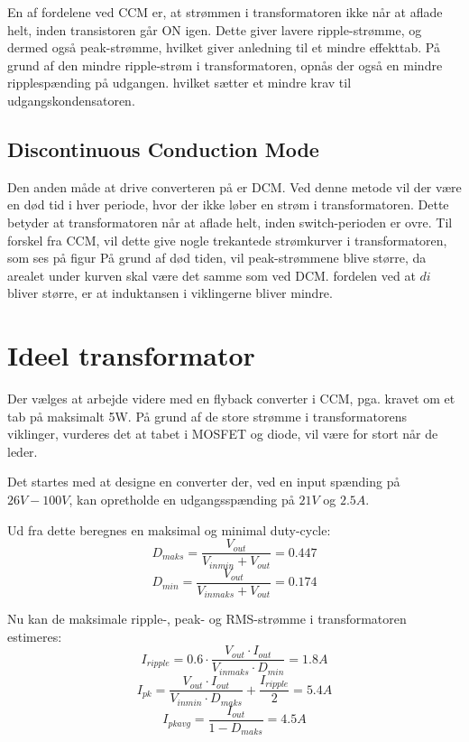 \noindent En af fordelene ved CCM er, at strømmen i transformatoren ikke når at aflade helt, inden transistoren går ON igen. Dette giver lavere ripple-strømme, og dermed også peak-strømme, hvilket giver anledning til et mindre effekttab. På grund af den mindre ripple-strøm i transformatoren, opnås der også en mindre ripplespænding på udgangen. hvilket sætter et mindre krav til udgangskondensatoren. 

\subsection{Discontinuous Conduction Mode}
Den anden måde at drive converteren på er DCM. Ved denne metode vil der være en død tid i hver periode, hvor der ikke løber en strøm i transformatoren. Dette betyder at transformatoren når at aflade helt, inden switch-perioden er ovre. Til forskel fra CCM, vil dette give nogle trekantede strømkurver i transformatoren, som ses på figur %
På grund af død tiden, vil peak-strømmene blive større, da arealet under kurven skal være det samme som ved DCM. fordelen ved at $di$ bliver større, er at induktansen i viklingerne bliver mindre. 

\section{Ideel transformator}
Der vælges at arbejde videre med en flyback converter i CCM, pga. kravet om et tab på maksimalt 5W. På grund af de store strømme i transformatorens viklinger, vurderes det at tabet i MOSFET og diode, vil være for stort når de leder. 

Det startes med at designe en converter der, ved en input spænding på $26V-100V$, kan opretholde en udgangsspænding på $21V$ og $2.5A$. 

\noindent Ud fra dette beregnes en maksimal og minimal duty-cycle:
\begin{equation} \label{D_maks_CCM}
D_{maks} = \frac{V_{out}}{V_{inmin} + V_{out}} = 0.447
\end{equation}
\begin{equation} \label{D_min_CCM}
D_{min} = \frac{V_{out}}{V_{inmaks} + V_{out}} = 0.174
\end{equation}

\noindent Nu kan de maksimale ripple-, peak- og RMS-strømme i transformatoren estimeres: 
\begin{equation} \label{I_ripple_CCM}
I_{ripple} = 0.6 \cdot \frac{V_{out} \cdot I_{out}}{V_{inmaks} \cdot   D_{min}} = 1.8A
\end{equation}
\begin{equation} \label{I_pk_CCM}
I_{pk} = \frac{V_{out} \cdot I_{out}}{V_{inmin} \cdot D_{maks}} + \frac{I_{ripple}}{2} = 5.4A
\end{equation}
\begin{equation} \label{I_pk_avg_CCM}
I_{pkavg} = \frac{I_{out}}{1-D_{maks}} = 4.5A
\end{equation}

